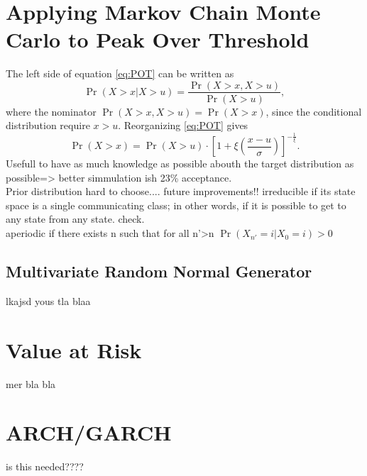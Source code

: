 


\cite{AccRate}\\%
\cite[p.~247]{compstat}


\section{Applying Markov Chain Monte Carlo to Peak Over Threshold}
The left side of equation \ref{eq:POT} can be written as %
\begin{equation}
\Pr(X>x|X>u)=\frac{\Pr(X>x,X>u)}{\Pr(X>u)}, 
\end{equation}
where the nominator $\Pr(X>x,X>u)=\Pr(X>x)$, since the conditional distribution require $x>u$. Reorganizing \ref{eq:POT} gives
\begin{equation}
\Pr(X>x)=\Pr(X>u)\cdot \left[1+\xi \left( \frac{x-u}{\sigma}\right)\right]^{-\frac{1}{\xi}}.
\label{eq:ConProbGev}
\end{equation}
%
%
%
%
%
Usefull to have as much knowledge as possible abouth the target distribution as possible=> better simmulation ish 23\% acceptance.\\
Prior distribution hard to choose.... future improvements!!
%
irreducible if its state space is a single communicating class; in other words, if it is possible to get to any state from any state. check.\\
aperiodic if there exists n such that for all n'>n $\Pr(X_{n'}=i|X_0=i)>0$ 



\subsection{Multivariate Random Normal Generator}
lkajsd yous tla blaa
\cite{BM}\\%
\section{Value at Risk}
mer bla bla
\section{ARCH/GARCH}%
is this needed????